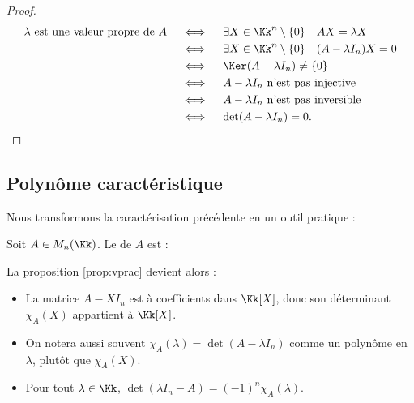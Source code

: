 \documentclass[11pt, class=report,crop=false]{standalone}
\begin{document}
\begin{proof}

\begin{align*}
\lambda \text{ est une valeur propre de } A
&\quad\iff\quad \exists X \in \Kk^n \setminus\{0\} \quad AX = \lambda X \\
&\quad\iff\quad \exists X \in \Kk^n \setminus\{0\} \quad  (A -\lambda I_n)X = 0 \\
&\quad\iff\quad \Ker(A-\lambda I_n) \neq \{0\} \\
&\quad\iff\quad A- \lambda I_n \text{ n'est pas injective} \\
&\quad\iff\quad A -\lambda I_n \text{ n'est pas inversible} \\
&\quad\iff\quad \det (A-\lambda I_n) = 0 .
\end{align*}

\end{proof}


\subsection{Polynôme caractéristique}

Nous transformons la caractérisation précédente en un outil pratique :

\begin{definition}
Soit $ A \in M_n(\Kk)$.
Le  de $A$ est :
\end{definition}



La proposition \ref{prop:vprac} devient alors :


\begin{remarque*}
\sauteligne
\begin{itemize}
  \item La matrice $A - XI_n$ est à coefficients dans $\Kk[X]$, donc son déterminant $\chi_A(X)$ appartient à $\Kk[X]$. 
  
  \item On notera aussi souvent $\chi_A(\lambda) = \det(A - \lambda I_n)$ comme un polynôme
  en $\lambda$, plutôt que $\chi_A(X)$.
    
  \item Pour tout $\lambda \in \Kk$, $\det (\lambda I_n-A) = (-1)^n\chi_A(\lambda)$.
\end{itemize}
\end{remarque*}
\end{document}
